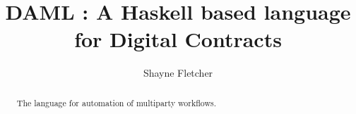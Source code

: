 \documentclass[acmsmall]{acmart}
\begin{document}
\title{DAML : A Haskell based language for Digital Contracts}

%
\author{Shayne Fletcher}

\renewcommand{\shortauthors}{Shayne Fletcher}


\begin{abstract}
The language for automation of multiparty workflows.
\end{abstract}

%
%
\end{document}
